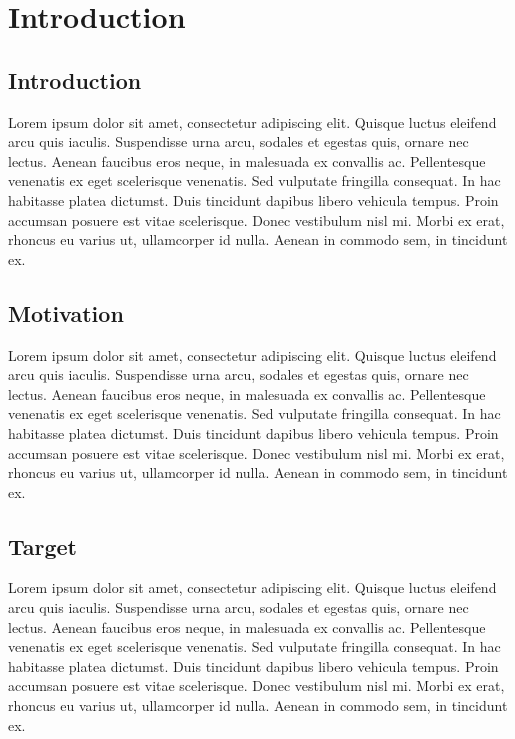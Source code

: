 
\chapter{Introduction} %

\label{Chapter1} %
\section{Introduction}
Lorem ipsum dolor sit amet, consectetur adipiscing elit. Quisque luctus eleifend arcu quis iaculis. Suspendisse urna arcu, sodales et egestas quis, ornare nec lectus. Aenean faucibus eros neque, in malesuada ex convallis ac. Pellentesque venenatis ex eget scelerisque venenatis. Sed vulputate fringilla consequat. In hac habitasse platea dictumst. Duis tincidunt dapibus libero vehicula tempus. Proin accumsan posuere est vitae scelerisque. Donec vestibulum nisl mi. Morbi ex erat, rhoncus eu varius ut, ullamcorper id nulla. Aenean in commodo sem, in tincidunt ex.

\section{Motivation}

Lorem ipsum dolor sit amet, consectetur adipiscing elit. Quisque luctus eleifend arcu quis iaculis. Suspendisse urna arcu, sodales et egestas quis, ornare nec lectus. Aenean faucibus eros neque, in malesuada ex convallis ac. Pellentesque venenatis ex eget scelerisque venenatis. Sed vulputate fringilla consequat. In hac habitasse platea dictumst. Duis tincidunt dapibus libero vehicula tempus. Proin accumsan posuere est vitae scelerisque. Donec vestibulum nisl mi. Morbi ex erat, rhoncus eu varius ut, ullamcorper id nulla. Aenean in commodo sem, in tincidunt ex.

\section{Target}
Lorem ipsum dolor sit amet, consectetur adipiscing elit. Quisque luctus eleifend arcu quis iaculis. Suspendisse urna arcu, sodales et egestas quis, ornare nec lectus. Aenean faucibus eros neque, in malesuada ex convallis ac. Pellentesque venenatis ex eget scelerisque venenatis. Sed vulputate fringilla consequat. In hac habitasse platea dictumst. Duis tincidunt dapibus libero vehicula tempus. Proin accumsan posuere est vitae scelerisque. Donec vestibulum nisl mi. Morbi ex erat, rhoncus eu varius ut, ullamcorper id nulla. Aenean in commodo sem, in tincidunt ex.
